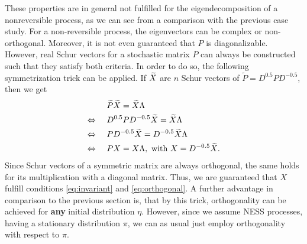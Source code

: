 These properties are in general not fulfilled for the eigendecomposition of a nonreversible process, as we can see from a comparison with the previous case study. For a non-reversible process, the eigenvectors can be complex or non-orthogonal. Moreover, it is not even guaranteed that $P$ is diagonalizable.  %
\\

However, real Schur vectors for a stochastic matrix $P$ can always be constructed such that they satisfy both criteria. In order to do so, the following symmetrization trick can be applied. If $\widetilde{X}$ are $n$ Schur vectors of $\widetilde{P} = D^{0.5} P D^{-0.5}$, then we get %
\begin{equation*}
\begin{aligned}
& \   & & \widetilde{P} \widetilde{X} = \widetilde{X} \Lambda  \\
\Leftrightarrow & \ & & D^{0.5} P D^{-0.5} \widetilde{X} = \widetilde{X} \Lambda \\
\Leftrightarrow & \ & & P D^{-0.5} \widetilde{X} =  D^{-0.5} \widetilde{X} \Lambda \\
\Leftrightarrow & \ & & P X = X \Lambda, \textrm{ with } X = D^{-0.5} \widetilde{X}.
\end{aligned}
\end{equation*}
Since Schur vectors of a symmetric matrix are always orthogonal, the same holds for its multiplication with a diagonal matrix.
Thus, we are guaranteed that $X$ fulfill conditions \eqref{eq:invariant} and \eqref{eq:orthogonal}.
A further advantage in comparison to the previous section is, that by this trick, orthogonality can be achieved for \textbf{any} initial distribution $\eta$.
However, since we assume NESS processes, having a stationary distribution $\pi$, we can as usual just employ orthogonality with respect to $\pi$.

